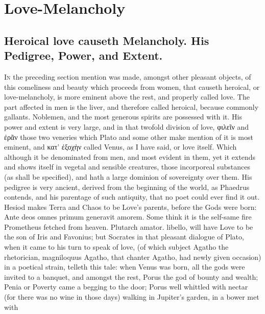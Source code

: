 \chapter{Love-Melancholy}

\section[Heroical love]{Heroical love causeth Melancholy. His Pedigree, Power, and Extent.}\label{sec:heroical-love}

\lettrine{I}{n} the preceding section mention was made, amongst other pleasant
objects, of this comeliness and beauty which proceeds from women, that
causeth heroical, or love-melancholy, is more eminent above the rest,
and properly called love. The part affected in men is the liver, and
therefore called heroical, because commonly gallants. Noblemen, and the
most generous spirits are possessed with it. His power and extent is
very large,  and in that twofold division of love, \textgreek{φιλεῖν} and
\textgreek{ἐρᾶν} those two veneries which Plato and some other make mention
of it is most eminent, and \textgreek{κατ' ἐξοχὴν} called Venus, as I have said, or
love itself. Which although it be denominated from men, and most
evident in them, yet it extends and shows itself in vegetal and
sensible creatures, those incorporeal substances (as shall be
specified), and hath a large dominion of sovereignty over them. His
pedigree is very ancient, derived from the beginning of the world, as
Phaedrus contends, and his  parentage of such antiquity,
that no poet could ever find it out. Hesiod makes Terra and Chaos
to be Love's parents, before the Gods were born: Ante deos omnes primum
generavit amorem. Some think it is the self-same fire Prometheus
fetched from heaven. Plutarch amator. libello, will have Love to be the
son of Iris and Favonius; but Socrates in that pleasant dialogue of
Plato, when it came to his turn to speak of love, (of which subject
Agatho the rhetorician, magniloquus Agatho, that chanter Agatho, had
newly given occasion) in a poetical strain, telleth this tale: when
Venus was born, all the gods were invited to a banquet, and amongst the
rest, Porus the god of bounty and wealth; Penia or Poverty came a
begging to the door; Porus well whittled with nectar (for there was no
wine in those days) walking in Jupiter's garden, in a bower met with
